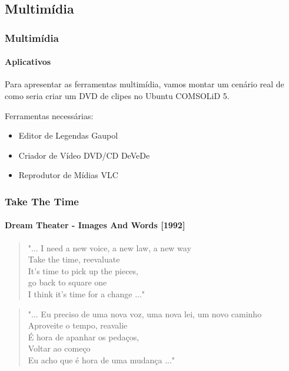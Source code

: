 \subsection{Multimídia}

\begin{frame}


\end{frame}

\begin{frame}\frametitle{Multimídia}\framesubtitle{Aplicativos}

Para apresentar as ferramentas multimídia, vamos montar um cenário real de como
seria criar um DVD de clipes no Ubuntu COMSOLiD 5.

Ferramentas necessárias:
\begin{itemize}
	\item Editor de Legendas Gaupol
	\item Criador de Vídeo DVD/CD DeVeDe
	\item Reprodutor de Mídias VLC
\end{itemize}

\end{frame}

\begin{frame}\frametitle{Take The Time}\framesubtitle{Dream Theater - Images And Words [1992]}

\begin{quote}
"... I need a new {\Large voice}, a new {\Large law}, a {\LARGE new way}\\
Take the time, reevaluate\\
It's time to {\LARGE pick up the pieces},\\
go back to {\large square one}\\
I think it's {\huge time for a change} ..."
\end{quote}

\begin{quote}
"... Eu preciso de uma nova voz, uma nova lei, um novo caminho\\
Aproveite o tempo, reavalie\\
É hora de apanhar os pedaços,\\
Voltar ao começo\\
Eu acho que é hora de uma mudança ..."
\end{quote}

\end{frame}

